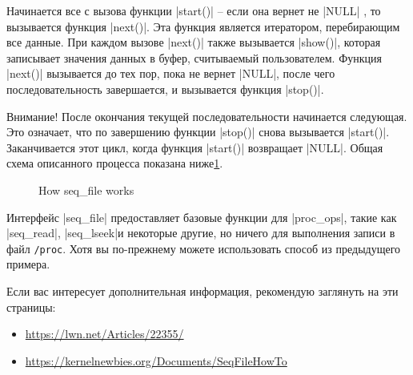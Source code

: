 \documentclass[10pt, oneside]{book}
\begin{document}
Начинается все с вызова функции \cpp|start()| – если она вернет не \cpp|NULL| , то вызывается функция \cpp|next()|.
Эта функция является итератором, перебирающим все данные. При каждом вызове \cpp|next()| также вызывается \cpp|show()|, которая записывает значения данных в буфер, считываемый пользователем.
Функция \cpp|next()| вызывается до тех пор, пока не вернет \cpp|NULL|, после чего последовательность завершается, и вызывается функция \cpp|stop()|.

Внимание! После окончания текущей последовательности начинается следующая. Это
означает, что по завершению функции \cpp|stop()| снова вызывается \cpp|start()|. Заканчивается
этот цикл, когда функция \cpp|start()| возвращает \cpp|NULL|.
Общая схема описанного процесса показана ниже\ref{img:seqfile}.

\begin{figure}[h]
  \center
  \caption{How seq\_file works}
  \label{img:seqfile}
\end{figure}

Интерфейс \cpp|seq_file| предоставляет базовые функции для \cpp|proc_ops|, такие как \cpp|seq_read|, \cpp|seq_lseek|и некоторые другие, но ничего для выполнения записи в файл \verb|/proc|.
Хотя вы по-прежнему можете использовать способ из предыдущего примера.


Если вас интересует дополнительная информация, рекомендую заглянуть на эти страницы:

\begin{itemize}
  \item \url{https://lwn.net/Articles/22355/}
  \item \url{https://kernelnewbies.org/Documents/SeqFileHowTo}
\end{itemize}
\end{document}
